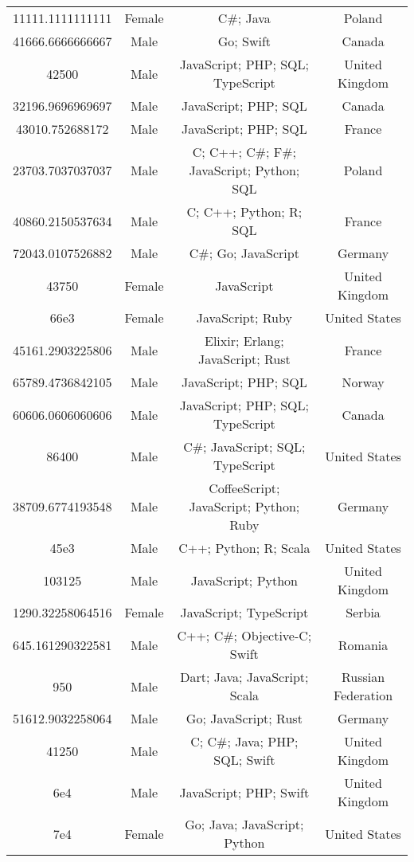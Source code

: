 \begin{center}
\begin{tabular}{ |c|c|c|c| }
11111.1111111111  &  Female  &  C\#; Java  &  Poland  \\ 
41666.6666666667  &  Male  &  Go; Swift  &  Canada  \\ 
42500  &  Male  &  JavaScript; PHP; SQL; TypeScript  &  United Kingdom  \\ 
32196.9696969697  &  Male  &  JavaScript; PHP; SQL  &  Canada  \\ 
43010.752688172  &  Male  &  JavaScript; PHP; SQL  &  France  \\ 
23703.7037037037  &  Male  &  C; C++; C\#; F\#; JavaScript; Python; SQL  &  Poland  \\ 
40860.2150537634  &  Male  &  C; C++; Python; R; SQL  &  France  \\ 
72043.0107526882  &  Male  &  C\#; Go; JavaScript  &  Germany  \\ 
43750  &  Female  &  JavaScript  &  United Kingdom  \\ 
66e3  &  Female  &  JavaScript; Ruby  &  United States  \\ 
45161.2903225806  &  Male  &  Elixir; Erlang; JavaScript; Rust  &  France  \\ 
65789.4736842105  &  Male  &  JavaScript; PHP; SQL  &  Norway  \\ 
60606.0606060606  &  Male  &  JavaScript; PHP; SQL; TypeScript  &  Canada  \\ 
86400  &  Male  &  C\#; JavaScript; SQL; TypeScript  &  United States  \\ 
38709.6774193548  &  Male  &  CoffeeScript; JavaScript; Python; Ruby  &  Germany  \\ 
45e3  &  Male  &  C++; Python; R; Scala  &  United States  \\ 
103125  &  Male  &  JavaScript; Python  &  United Kingdom  \\ 
1290.32258064516  &  Female  &  JavaScript; TypeScript  &  Serbia  \\ 
645.161290322581  &  Male  &  C++; C\#; Objective-C; Swift  &  Romania  \\ 
950  &  Male  &  Dart; Java; JavaScript; Scala  &  Russian Federation  \\ 
51612.9032258064  &  Male  &  Go; JavaScript; Rust  &  Germany  \\ 
41250  &  Male  &  C; C\#; Java; PHP; SQL; Swift  &  United Kingdom  \\ 
6e4  &  Male  &  JavaScript; PHP; Swift  &  United Kingdom  \\ 
7e4  &  Female  &  Go; Java; JavaScript; Python  &  United States  \\ 

\end{tabular}
\end{center}
